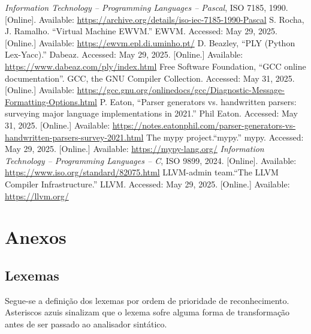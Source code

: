 \documentclass[12pt, a4paper]{article}
\begin{document}
\begin{thebibliography}{9}
        \emph{Information Technology -- Programming Languages -- Pascal}, ISO 7185, 1990. [Online].
        Available: \url{https://archive.org/details/iso-iec-7185-1990-Pascal}
        S. Rocha, J. Ramalho. ``Virtual Machine EWVM.'' EWVM. Accessed: May 29, 2025. [Online.]
        Available: \url{https://ewvm.epl.di.uminho.pt/}
        D. Beazley, ``PLY (Python Lex-Yacc).'' Dabeaz. Accessed: May 29, 2025. [Online.] Available:
        \url{https://www.dabeaz.com/ply/index.html}
        Free Software Foundation, ``GCC online documentation''. GCC, the GNU Compiler Collection.
        Accessed: May 31, 2025. [Online.] Available:
        \url{https://gcc.gnu.org/onlinedocs/gcc/Diagnostic-Message-Formatting-Options.html}
        P. Eaton, ``Parser generators vs. handwritten parsers: surveying major language
        implementations in 2021.'' Phil Eaton. Accessed: May 31, 2025. [Online.] Available:
        \url{https://notes.eatonphil.com/parser-generators-vs-handwritten-parsers-survey-2021.html}
        The mypy project.``mypy.'' mypy. Accessed: May 29, 2025. [Online.] Available:
        \url{https://mypy-lang.org/}
        \emph{Information Technology -- Programming Languages -- C}, ISO 9899, 2024. [Online].
        Available: \url{https://www.iso.org/standard/82075.html}
        LLVM-admin team.``The LLVM Compiler Infrastructure.'' LLVM. Accessed: May 29, 2025.
        [Online.] Available: \url{https://llvm.org/}
\end{thebibliography}
\endgroup

\section{Anexos}

\subsection{Lexemas}
\label{lexer-definition}

Segue-se a definição dos lexemas por ordem de prioridade de reconhecimento. Asteriscos azuis
sinalizam que o lexema sofre alguma forma de transformação antes de ser passado ao analisador
sintático.

\end{document}
